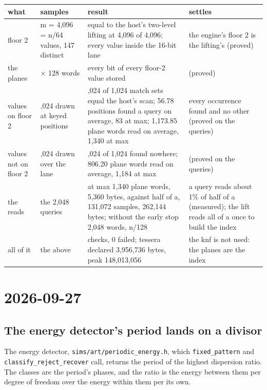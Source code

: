 {\footnotesize
\setlength{\tabcolsep}{6pt}
\begin{longtable}{>{\RaggedRight\arraybackslash}p{}>{\RaggedRight\arraybackslash}p{}>{\RaggedRight\arraybackslash}p{}>{\RaggedRight\arraybackslash}p{}}
\toprule
what & samples & result & settles \\
\midrule
\endhead
floor 2 & m = 4,096 = n/64 values, 147 distinct & equal to the host's two-level lifting at 4,096 of 4,096; every value inside the 16-bit lane & the engine's floor 2 is the lifting's (proved) \\
the planes & 16 × 128 words & every bit of every floor-2 value stored & (proved) \\
values on floor 2 & 1,024 drawn at keyed positions & 1,024 of 1,024 match sets equal the host's scan; 56.78 positions found a query on average, 83 at max; 1,173.85 plane words read on average, 1,340 at max & every occurrence found and no other (proved on the queries) \\
values not on floor 2 & 1,024 drawn over the lane & 1,024 of 1,024 found nowhere; 806.20 plane words read on average, 1,184 at max & (proved on the queries) \\
the reads & the 2,048 queries & at max 1,340 plane words, 5,360 bytes, against half of a, 131,072 samples, 262,144 bytes; without the early stop 2,048 words, n/128 & a query reads about 1\% of half of a (measured); the lift reads all of a once to build the index \\
all of it & the above & 11 checks, 0 failed; tessera declared 3,956,736 bytes, peak 148,013,056 & the knf is not used: the planes are the index \\
\bottomrule
\end{longtable}
}

\section{\texorpdfstring{2026-09-27}{2026-09-27}}

\subsection{\texorpdfstring{The energy detector's period lands on a divisor}{The energy detector's period lands on a divisor}}

The energy detector, \texttt{sims/\allowbreak{}art/\allowbreak{}periodic\_\allowbreak{}energy.\allowbreak{}h}, which \texttt{fixed\_\allowbreak{}pattern} and \texttt{classify\_\allowbreak{}reject\_\allowbreak{}recover} call, returns the period of the highest dispersion ratio. The classes are the period's phases, and the ratio is the energy between them per degree of freedom over the energy within them per its own.

